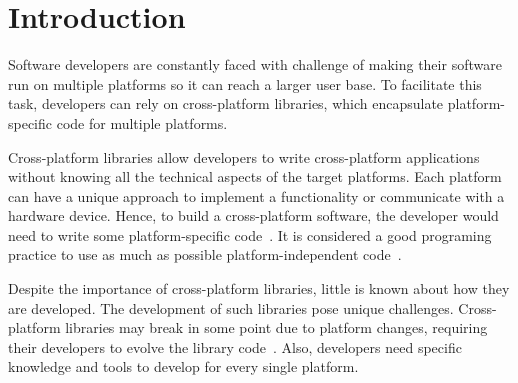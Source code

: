 \documentclass[10pt, conference]{IEEEtran}
\begin{document}
\section{Introduction}


Software developers are constantly faced with challenge of making their software run on multiple platforms so it can reach a larger user base. To facilitate this task, developers can rely on cross-platform libraries, which encapsulate platform-specific code for multiple platforms.



Cross-platform libraries allow developers to write cross-platform applications without knowing all the technical aspects of the target platforms. Each platform can have a unique approach to implement a functionality or communicate with a hardware device. Hence, to build a cross-platform software, the developer would need to write some platform-specific code~\cite{bishop2006,backblaze2008}. It is considered a good programing practice to use as much as possible platform-independent code~\cite{bishop2006,backblaze2008}. 




Despite the importance of cross-platform libraries, little is known about how they are developed. The development of such libraries pose unique challenges. Cross-platform libraries may break in some point due to  platform changes, requiring their developers to evolve the library code~\cite{bishop2006}. Also,  developers need specific knowledge and tools to develop for every single platform.
\end{document}
